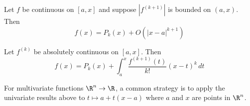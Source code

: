 \documentclass{article}
\begin{document}
\begin{tcolorbox}
  \begin{corollary}
    Let $f$ be continuous on $[a, x]$ and suppose $|f^{(k+1)}|$ is bounded on $(a, x)$.
    Then
    \[f(x) = P_k(x) + O\left(|x - a|^{k+1}\right)\]
  \end{corollary}
\end{tcolorbox}
\begin{theorem}
  Let $f^{(k)}$ be absolutely continuous on $[a, x]$.
  Then
  \[f(x) = P_k(x) + \int_a^x \frac{f^{(k+1)}(t)}{k!} (x - t)^k\,dt\]  
\end{theorem}

For multivariate functions $\R^n \to \R$, a common strategy is to apply the univariate results above to $t \mapsto a + t(x - a)$
where $a$ and $x$ are points in $\R^n$.

\end{document}
